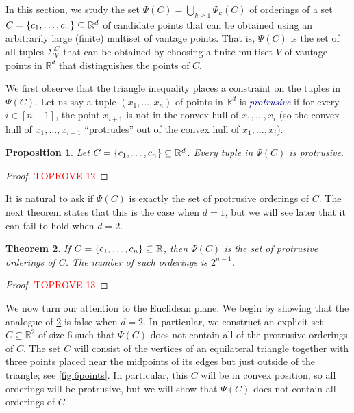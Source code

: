 \documentclass[11pt]{amsart}
\newtheorem{theorem}{Theorem}[section]
\newtheorem{proposition}[theorem]{Proposition}
\theoremstyle{definition}
\DeclarePairedDelimiter{\set}{\{}{\}}
\newcommand{\RR}{\mathbb{R}}
\newcommand{\dfn}[1]{\textcolor{darkblue}{\emph{#1}}}
\begin{document}
In this section, we study the set $\Psi(C)=\bigcup_{k\geq 1}\Psi_k(C)$ of orderings of a set $C=\set{c_1,\ldots,c_n}\subseteq\RR^d$ of candidate points that can be obtained using an arbitrarily large (finite) multiset of vantage points. That is, $\Psi(C)$ is the set of all tuples $\Sigma_V^C$ that can be obtained by choosing a finite multiset $V$ of vantage points in $\RR^d$ that distinguishes the points of $C$. 

We first observe that the triangle inequality places a constraint on the tuples in $\Psi(C)$. Let us say a tuple $(x_1,\ldots,x_n)$ of points in $\RR^d$ is \dfn{protrusive} if for every $i\in[n-1]$, the point $x_{i+1}$ is not in the convex hull of $x_1,\ldots,x_i$ (so the convex hull of $x_1,\ldots,x_{i+1}$ ``protrudes'' out of the convex hull of $x_1,\ldots,x_i$). 

\begin{proposition}\label{prop:convexity}
Let $C=\set{c_1,\ldots,c_n}\subseteq\RR^d$. Every tuple in $\Psi(C)$ is protrusive.  
\end{proposition}

\begin{proof}\textcolor{red}{TOPROVE 12}\end{proof}

It is natural to ask if $\Psi(C)$ is exactly the set of protrusive orderings of $C$. The next theorem states that this is the case when $d=1$, but we will see later that it can fail to hold when $d=2$. 

\begin{theorem}\label{thm:protrusive_d_1}
If $C=\set{c_1,\ldots,c_n}\subseteq \RR$, then $\Psi(C)$ is the set of protrusive orderings of $C$. The number of such orderings is $2^{n-1}$. 
\end{theorem}

\begin{proof}\textcolor{red}{TOPROVE 13}\end{proof}

We now turn our attention to the Euclidean plane. We begin by showing that the analogue of \cref{thm:protrusive_d_1} is false when $d=2$.  In particular, we construct an explicit set $C \subseteq \RR^2$ of size $6$ such that $\Psi(C)$ does not contain all of the protrusive orderings of $C$.  The set $C$ will consist of the vertices of an equilateral triangle together with three points placed near the midpoints of its edges but just outside of the triangle; see \cref{fig:6points}.  In particular, this $C$ will be in convex position, so all orderings will be protrusive, but we will show that $\Psi(C)$ does not contain all orderings of $C$.
\end{document}
